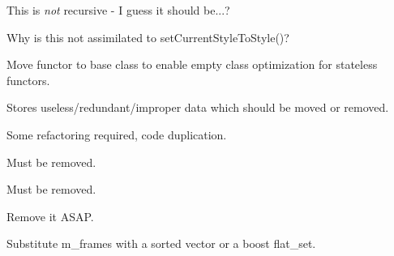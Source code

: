 
\begin{DoxyRefList}
\item[Member \mbox{\hyperlink{class_function_tree_model_1_1_channel_group_a6510554284097aa2c57e462f369abd68}{Function\+Tree\+Model\+::Channel\+Group\+::apply\+Show\+Filter}} ()]\label{todo__todo000010}%
%
This is {\itshape not} recursive -\/ I guess it should be...?  
\item[Member \mbox{\hyperlink{class_style_editor_a5cb8cc4c1dfca53d45fd7b8fe49634e3}{Style\+Editor\+::get\+Color\+Param}} () const]\label{todo__todo000006}%
%
Why is this not assimilated to set\+Current\+Style\+To\+Style()?  
\item[Class \mbox{\hyperlink{classtcg_1_1controlled__access}{tcg\+::controlled\+\_\+access\texorpdfstring{$<$}{<} Obj, Func \texorpdfstring{$>$}{>}}} ]\label{todo__todo000003}%
%
Move functor to base class to enable empty class optimization for stateless functors.  
\item[Class \mbox{\hyperlink{class_t_image_info}{TImage\+Info}} ]\label{todo__todo000004}%
%
Stores useless/redundant/improper data which should be moved or removed.  
\item[Member \mbox{\hyperlink{namespace_toonz_ext_afc2e773c11a739935be9804745e2cd49}{Toonz\+Ext\+::rotate\+Control\+Point}} (const \mbox{\hyperlink{class_t_stroke}{TStroke}} $\ast$stroke, const \mbox{\hyperlink{class_toonz_ext_1_1_even_int}{Toonz\+Ext\+::\+Even\+Int}} \&even, double at\+Length)]\label{todo__todo000002}%
%
Some refactoring required, code duplication.  
\item[Member \mbox{\hyperlink{class_t_render_settings_a52dd41881bbf6aaf953fe300be2e233e}{TRender\+Settings\+::m\+\_\+shrinkX}} ]\label{todo__todo000007}%
%
Must be removed.  
\item[Member \mbox{\hyperlink{class_t_render_settings_ae1882f584ce9ffad12ce6bf9ff23814c}{TRender\+Settings\+::m\+\_\+shrinkY}} ]\label{todo__todo000008}%
%
Must be removed.  
\item[Member \mbox{\hyperlink{class_t_vector_render_data_a812f28d5a4ee07a48b9e074d9e133559}{TVector\+Render\+Data\+::TVector\+Render\+Data}} (\mbox{\hyperlink{struct_t_vector_render_data_1_1_viewer_settings}{Viewer\+Settings}}, const \mbox{\hyperlink{class_t_affine}{TAffine}} \&aff, const TRect \&clipping\+Rect, const \mbox{\hyperlink{class_t_palette}{TPalette}} $\ast$palette, const \mbox{\hyperlink{class_t_color_function}{TColor\+Function}} $\ast$cf=0)]\label{todo__todo000009}%
%
Remove it ASAP.  
\item[Class \mbox{\hyperlink{class_t_xsh_simple_level}{TXsh\+Simple\+Level}} ]\label{todo__todo000005}%
%
Substitute m\+\_\+frames with a sorted vector or a boost flat\+\_\+set. 
\end{DoxyRefList}